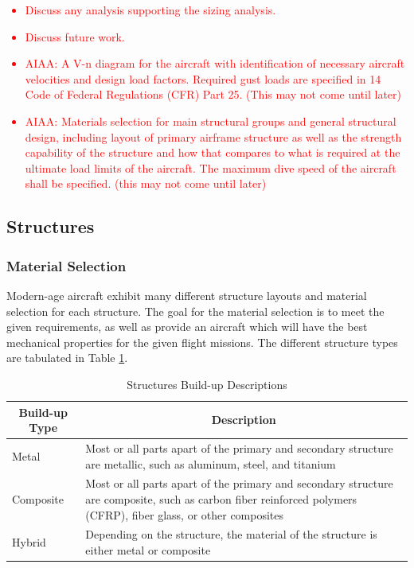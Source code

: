 \textcolor{red}{
\begin{itemize}
    \item Discuss any analysis supporting the sizing analysis.
    \item Discuss future work.
    \item AIAA: A V-n diagram for the aircraft with identification of necessary aircraft velocities and design load factors.
    Required gust loads are specified in 14 Code of Federal Regulations (CFR) Part 25. (This may not come until later)
    \item AIAA: Materials selection for main structural groups and general structural design, including layout of primary airframe structure as well as the strength capability of the structure
    and how that compares to what is required at the ultimate load limits of the aircraft.
    The maximum dive speed of the aircraft shall be specified. (this may not come until later)
\end{itemize}}

\subsection{Structures}
\subsubsection{Material Selection}
Modern-age aircraft exhibit many different structure layouts and material selection for each structure. The goal for the material selection is to meet the given requirements, as well as provide an aircraft which will have the best mechanical properties for the given flight missions. The different structure types are tabulated in Table \ref{tab:structure_material_table}.

\begin{table}[!h]
\centering
\caption{Structures Build-up Descriptions }
\label{tab:structure_material_table}
\begin{tabular}{ |p{2cm}|p{13cm}| }
\hline
\multicolumn{1}{|c|}{\textbf{Build-up Type}} & \multicolumn{1}{c|}{\textbf{Description}}                                                                                                                       \\ \hline
Metal                                        & Most or all parts apart of the primary and secondary structure are metallic, such as aluminum, steel, and titanium                                              \\ \hline
Composite                                    & Most or all parts apart of the primary and secondary structure are composite, such as carbon fiber reinforced polymers (CFRP), fiber glass, or other composites \\ \hline
Hybrid                                       & Depending on the structure, the material of the structure is either metal or composite                                                                            \\ \hline
\end{tabular}
\end{table}

